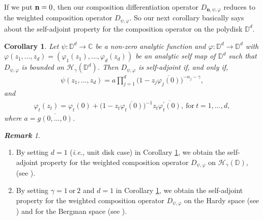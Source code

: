 \documentclass[12pt, reqno]{amsart}
\newtheorem{corollary}[theorem]{Corollary}
\theoremstyle{definition}
\theoremstyle{remark}
\newtheorem{remark}[theorem]{\bf{Remark}}
\numberwithin{equation}{section}
\newcommand{\mfn}{\mathbf n}
\begin{document}
 If we put ${\bf n}=0$, then our composition differentiation operator $D_{\mfn,\psi,\varphi}$ reduces to the weighted composition operator $D_{\psi,\varphi}$. So our next corollary basically says about the self-adjoint property for the composition operator on the polydisk $\mathbb{D}^d$.
 
 
 \begin{corollary}\label{Cor_2.10}
	Let $\psi: \mathbb{D}^d\longrightarrow \mathbb{C}$ be a non-zero analytic function and $\varphi: \mathbb{D}^d\longrightarrow \mathbb{D}^d$ with $\varphi(z_1,  \dots, z_d)=(\varphi_1(z_1), \dots, \varphi_d(z_d))$ be an analytic self map of $\mathbb{D}^d$ such that $D_{\psi,\varphi}$ is bounded on $\mathcal{H}_\gamma(\mathbb{D}^d)$.
	Then $D_{\psi,\varphi}$ is self-adjoint if, and only if,
	\begin{gather*}
	\psi(z_1, \dots, z_d)=a\prod_{j=1}^d\big(1-z_j\overline{\varphi_j(0)}\big)^{-n_j-\gamma},
	\end{gather*}
	and 
	\begin{gather*}
	\varphi_t(z_t)=\varphi_t(0)+\big(1-z_t\overline{\varphi_t(0)}\big)^{-1}z_t\overline{\varphi_t^{\prime}(0)},~ \mbox{for}~ t=1, \dots, d,
	\end{gather*}
	where $a=\overline{g(0, \dots, 0)}$.
\end{corollary}
\begin{remark}
	\begin{enumerate}
		\item[(i)] By setting $d=1$ ({\it i.e.,} unit disk case) in Corollary \ref{Cor_2.10}, we obtain the self-adjoint property for the weighted composition operator $D_{\psi,\varphi}$ on $\mathcal{H}_\gamma(\mathbb{D})$, (see \cite[Theorem 2.9]{Lim_Khoi_JMAA_2018}).
		\item[(ii)]  By setting $\gamma=1~ \mbox{or}~ 2$ and $d=1$ in Corollary \ref{Cor_2.10}, we obtain the self-adjoint property for the weighted composition operator $D_{\psi,\varphi}$ on the Hardy space (see \cite[Theorem 3.3]{Han_Wang_JMAA_2021}) and for the Bergman space (see \cite[Theorem 2.3]{Liu_Ponnusamy_Xie_LAMA_2023}). 
	\end{enumerate}
\end{remark}
\end{document}
